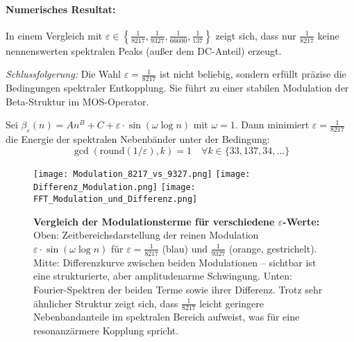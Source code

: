 \paragraph{Numerisches Resultat:}
In einem Vergleich mit $\varepsilon \in \left\{ \frac{1}{8217}, \frac{1}{9327}, \frac{1}{66600}, \frac{1}{137} \right\}$ zeigt sich, dass nur $\frac{1}{8217}$ keine nennenswerten spektralen Peaks (außer dem DC-Anteil) erzeugt.

\vspace{0.5em}
\noindent
\emph{Schlussfolgerung:} Die Wahl $\varepsilon = \frac{1}{8217}$ ist nicht beliebig, sondern erfüllt präzise die Bedingungen spektraler Entkopplung. Sie führt zu einer stabilen Modulation der Beta-Struktur im MOS-Operator.



\begin{lemma}
Sei $\beta_\varepsilon(n) = A n^B + C + \varepsilon \cdot \sin(\omega \log n)$ mit $\omega = 1$.  
Dann minimiert $\varepsilon = \frac{1}{8217}$ die Energie der spektralen Nebenbänder unter der Bedingung:
\[
\gcd(\text{round}(1/\varepsilon), k) = 1 \quad \forall k \in \{33, 137, 34, \dots\}
\]
\end{lemma}

\begin{figure}[htbp]
    \centering
    \texttt{[image: Modulation\_8217\_vs\_9327.png]}
    \texttt{[image: Differenz\_Modulation.png]}
    \texttt{[image: FFT\_Modulation\_und\_Differenz.png]}
    \caption{
    \textbf{Vergleich der Modulationsterme für verschiedene $\varepsilon$-Werte:}
    Oben: Zeitbereichsdarstellung der reinen Modulation $\varepsilon \cdot \sin(\omega \log n)$ für $\varepsilon = \frac{1}{8217}$ (blau) und $\frac{1}{9327}$ (orange, gestrichelt).  
    Mitte: Differenzkurve zwischen beiden Modulationen – sichtbar ist eine strukturierte, aber amplitudenarme Schwingung.  
    Unten: Fourier-Spektren der beiden Terme sowie ihrer Differenz.  
    Trotz sehr ähnlicher Struktur zeigt sich, dass $\frac{1}{8217}$ leicht geringere Nebenbandanteile im spektralen Bereich aufweist, was für eine resonanzärmere Kopplung spricht.
    }
    \label{fig:ModulationFFTVergleich}
\end{figure}